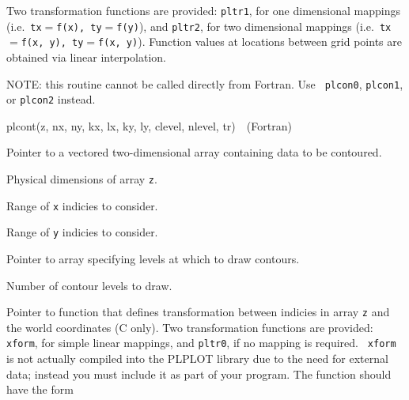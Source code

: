 Two transformation functions are provided:  {\tt pltr1}, for one dimensional
mappings (i.e.~{\tt tx$=$f(x), ty$=$f(y)}), and {\tt pltr2}, for two
dimensional mappings (i.e.~{\tt tx$=$f(x, y), ty$=$f(x, y)}).  Function values
at locations between grid points are obtained via linear interpolation.  

NOTE:  this routine cannot be called directly from Fortran.  Use {\tt
plcon0}, {\tt plcon1}, or {\tt plcon2} instead.


	{plcont(z, nx, ny, kx, lx, ky, ly, clevel, nlevel, tr)}{\ \ (Fortran)}
\label{plcont}


 {Pointer to a vectored two-dimensional array
containing data to be contoured.}

 {Physical dimensions of array {\tt z}.}

 {Range of {\tt x} indicies to consider.}

 {Range of {\tt y} indicies to consider.}

 {Pointer to array specifying
    levels at which to draw contours.}

 {Number of contour levels to draw.}

 {Pointer to function that defines
transformation between indicies in array {\tt z} and the world coordinates
(C only).  Two transformation functions are provided:  {\tt xform}, for
simple linear mappings, and {\tt pltr0}, if no mapping is required.  {\tt
xform} is not actually compiled into the PLPLOT library due to the need for
external data; instead you must include it as part of your program.  The
function should have the form

  }

